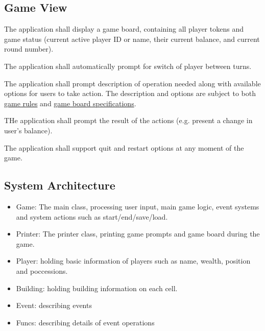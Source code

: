     \subsection{Game View}
      \begin{enumerate}[label=\texttt{[FUNC-REQ-\arabic*]}:, start=5, leftmargin=10em]
        \item The application shall display a game board, containing all player tokens and game status (current active player ID or name, their current balance, and current round number).
        \item The application shall automatically prompt for switch of player between turns. 
        \item The application shall prompt description of operation needed along with available options for users to take action. The description and options are subject to both  \hyperref[sec:game-rules]{game rules} and \hyperref[sec:board-specs]{game board specifications}.
        \item THe application shall prompt the result of the actions (e.g. present a change in user's  balance).
        \item The application shall support quit and restart options at any moment of the game.
      \end{enumerate}
      
    \subsection{System Architecture}
      \begin{itemize}
        \item Game: The main class, processing user input, main game logic, event systems and system actions such as start/end/save/load. 
        \item Printer: The printer class, printing game prompts and game board during the game.
        \item Player: holding basic information of players such as name, wealth, position and poccessions.
        \item Building: holding building information on each cell.
        \item Event: describing events
        \item Funcs: describing details of event operations
      \end{itemize}

